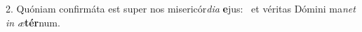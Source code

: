 2. Quóniam confirmáta est super nos misericór\textit{di}\textit{a} \textbf{e}jus: \ast\  et véritas Dómini ma\textit{net} \textit{in} \textit{æ}\textbf{tér}num.\

